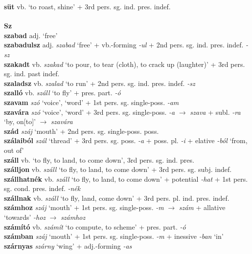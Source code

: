 \documentclass[11pt]{article}
\begin{document}
\textbf{süt} vb. `to roast, shine' + 3rd pers. sg. ind. pres. indef. \\
\ \\
\noindent \textbf{\large Sz} \\
\textbf{szabad} adj. `free' \\
\textbf{szabadulsz} adj. \emph{szabad} `free' + vb.\hyp{}forming \emph{-ul} +
2nd pers. sg. ind. pres. indef. \emph{-sz} \\
\textbf{szakadt} vb. \emph{szakad} `to pour, to tear (cloth), to crack
up (laughter)' + 3rd pers. sg. ind. past indef. \\
\textbf{szaladsz} vb. \emph{szalad} `to run' + 2nd
pers. sg. ind. pres. indef. \emph{-sz} \\
\textbf{szalló} vb. \emph{száll} `to fly' + pres. part. \emph{-ó} \\
\textbf{szavam} \emph{szó} `voice', `word' + 1st
pers. sg. single\hyp{}poss. \emph{-am} \\
\textbf{szavára} \emph{szó} `voice', `word' + 3rd pers. sg. single\hyp{}poss. \emph{-a} $\rightarrow$ \emph{szava} + subl. \emph{-ra} `by, on[to]'
$\rightarrow$ \emph{szavára} \\
\textbf{szád} \emph{száj} `mouth' + 2nd
pers. sg. single\hyp{}poss. poss. \\
\textbf{szálaiból} \emph{szál} `thread' + 3rd
pers. sg. poss. \emph{-a} + poss. pl. \emph{-i} + elative \emph{-ból}
`from, out of' \\
\textbf{száll} vb. `to fly, to land, to come down', 3rd
pers. sg. ind. pres. \\
\textbf{szálljon} vb. \emph{száll} `to fly, to land, to come down'
+ 3rd pers. sg. subj. indef. \\
\textbf{szállhatnék} vb. \emph{száll} `to fly, to land, to come down'
+ potential \emph{-hat} + 1st pers. sg. cond. pres. indef. \emph{-nék} \\
\textbf{szállnak} vb. \emph{száll} `to fly, land, come down' + 3rd
pers. pl. ind. pres. indef. \\
\textbf{számhoz} \emph{száj} `mouth' + 1st pers. sg. single\hyp{}poss. \emph{-m} $\rightarrow$ \emph{szám} +
allative `towards' \emph{-hoz} $\rightarrow$ \emph{számhoz} \\
\textbf{számító} vb. \emph{számít} `to compute, to scheme' +
pres. part. \emph{-ó} \\
\textbf{számban} \emph{száj} `mouth' + 1st
pers. sg. single\hyp{}poss. \emph{-m} + inessive \emph{-ban} `in' \\
\textbf{szárnyas} \emph{szárny} `wing' + adj.\hyp{}forming \emph{-as}
\end{document}
